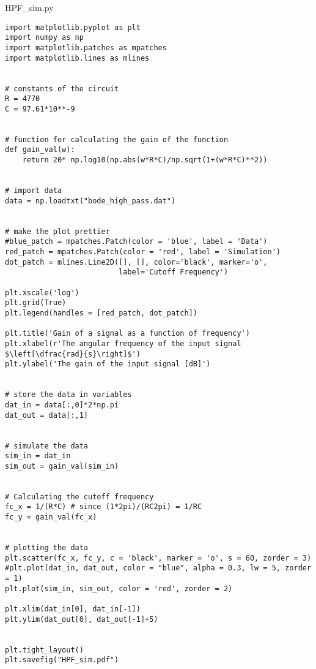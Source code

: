 \lstlistingname{ HPF\_sim.py}
\begin{lstlisting}[breaklines]
import matplotlib.pyplot as plt
import numpy as np
import matplotlib.patches as mpatches
import matplotlib.lines as mlines


# constants of the circuit
R = 4770
C = 97.61*10**-9


# function for calculating the gain of the function
def gain_val(w):
    return 20* np.log10(np.abs(w*R*C)/np.sqrt(1+(w*R*C)**2))


# import data
data = np.loadtxt("bode_high_pass.dat")


# make the plot prettier
#blue_patch = mpatches.Patch(color = 'blue', label = 'Data')
red_patch = mpatches.Patch(color = 'red', label = 'Simulation')
dot_patch = mlines.Line2D([], [], color='black', marker='o',
                          label='Cutoff Frequency')

plt.xscale('log')
plt.grid(True)
plt.legend(handles = [red_patch, dot_patch])

plt.title('Gain of a signal as a function of frequency')    
plt.xlabel(r'The angular frequency of the input signal $\left[\dfrac{rad}{s}\right]$')
plt.ylabel('The gain of the input signal [dB]')


# store the data in variables
dat_in = data[:,0]*2*np.pi
dat_out = data[:,1]


# simulate the data
sim_in = dat_in
sim_out = gain_val(sim_in)


# Calculating the cutoff frequency
fc_x = 1/(R*C) # since (1*2pi)/(RC2pi) = 1/RC
fc_y = gain_val(fc_x)


# plotting the data
plt.scatter(fc_x, fc_y, c = 'black', marker = 'o', s = 60, zorder = 3)
#plt.plot(dat_in, dat_out, color = "blue", alpha = 0.3, lw = 5, zorder = 1)
plt.plot(sim_in, sim_out, color = 'red', zorder = 2)

plt.xlim(dat_in[0], dat_in[-1])
plt.ylim(dat_out[0], dat_out[-1]+5)


plt.tight_layout()
plt.savefig("HPF_sim.pdf")

\end{lstlisting}